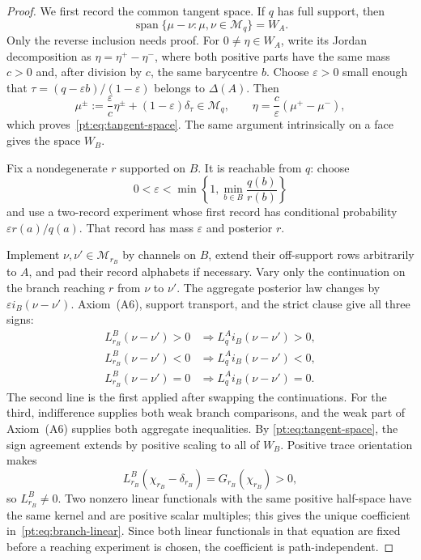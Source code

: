 \begin{proof}
We first record the common tangent space.  If $q$ has full support, then
\begin{equation}
 \operatorname{span}\{\mu-\nu:\mu,\nu\in\mathcal M_q\}=W_A.
\label{pt:eq:tangent-space}
\end{equation}
Only the reverse inclusion needs proof.  For $0\ne\eta\in W_A$, write its
Jordan decomposition as $\eta=\eta^+-\eta^-$, where both positive parts have
the same mass $c>0$ and, after division by $c$, the same barycentre $b$.
Choose $\varepsilon>0$ small enough that
$\tau=(q-\varepsilon b)/(1-\varepsilon)$ belongs to $\Delta(A)$.  Then
\[
 \mu^\pm:=\frac{\varepsilon}{c}\eta^\pm
          +(1-\varepsilon)\delta_\tau
 \in\mathcal M_q,
 \qquad
 \eta=\frac c\varepsilon(\mu^+-\mu^-),
\]
which proves~\eqref{pt:eq:tangent-space}.  The same argument intrinsically on
a face gives the space $W_B$.

Fix a nondegenerate $r$ supported on $B$.  It is reachable from $q$: choose
\[
 0<\varepsilon<\min\left\{1,
       \min_{b\in B}\frac{q(b)}{r(b)}\right\}
\]
and use a two-record experiment whose first record has conditional probability
$\varepsilon r(a)/q(a)$.  That record has mass $\varepsilon$ and posterior
$r$.

Implement $\nu,\nu'\in\mathcal M_{r_B}$ by channels on $B$, extend their
off-support rows arbitrarily to $A$, and pad their record alphabets if
necessary.  Vary only the continuation on the branch reaching $r$ from
$\nu$ to $\nu'$.  The aggregate posterior law changes by
$\varepsilon i_B(\nu-\nu')$.  Axiom~\textup{(A6)}, support transport, and the
strict clause give all three signs:
\begin{align*}
 L_{r_B}^B(\nu-\nu')>0&\Longrightarrow
     L_q^A i_B(\nu-\nu')>0,\\
 L_{r_B}^B(\nu-\nu')<0&\Longrightarrow
     L_q^A i_B(\nu-\nu')<0,\\
 L_{r_B}^B(\nu-\nu')=0&\Longrightarrow
     L_q^A i_B(\nu-\nu')=0.
\end{align*}
The second line is the first applied after swapping the continuations.  For
the third, indifference supplies both weak branch comparisons, and the weak
part of Axiom~\textup{(A6)} supplies both aggregate inequalities.  By
\eqref{pt:eq:tangent-space}, the sign agreement extends by positive scaling
to all of $W_B$.  Positive trace orientation makes
\[
 L_{r_B}^B(\chi_{r_B}-\delta_{r_B})
 =G_{r_B}(\chi_{r_B})>0,
\]
so $L_{r_B}^B\ne0$.  Two nonzero linear functionals with the same positive
half-space have the same kernel and are positive scalar multiples; this gives
the unique coefficient in~\eqref{pt:eq:branch-linear}.  Since both linear
functionals in that equation are fixed before a reaching experiment is
chosen, the coefficient is path-independent.


\end{proof}

